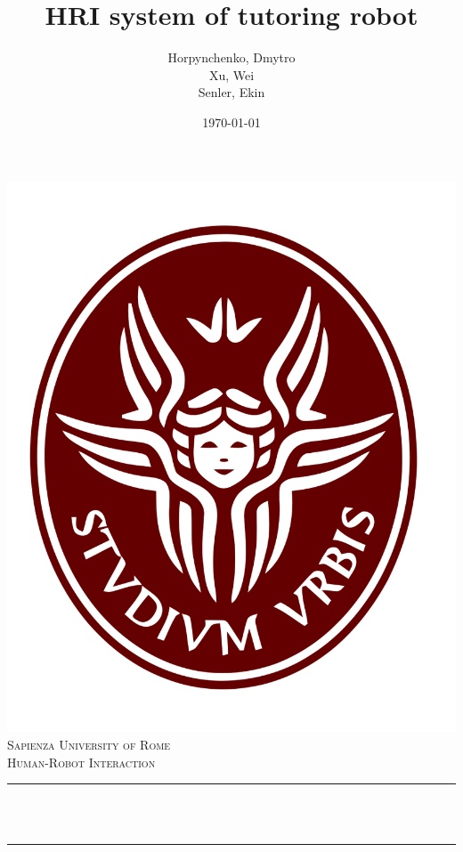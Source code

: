 \documentclass[12pt]{article}
\title{HRI system of tutoring robot}                 %
\author{Horpynchenko, Dmytro \\ Xu, Wei \\ Senler, Ekin}                                                           %
\date{\today}                                                                               %
\makeatletter
\let\thetitle\@title
\makeatother
\begin{document}
 
 
\begin{titlepage}
        \centering
    \includegraphics[scale = 0.2]{images/sapienza_logo_only.png}\\[1.0 cm]  %
    \textsc{\LARGE Sapienza University of Rome}\\[2.0 cm]    %
    \vspace{2cm}
        \textsc{\Large Human-Robot Interaction}\\[0.5 cm]                           %
        \rule{\linewidth}{0.2 mm} \\[0.4 cm]
        { \huge \bfseries \thetitle}\\
        \rule{\linewidth}{0.2 mm} \\[1.5 cm]
 

\end{titlepage}
\end{document}

